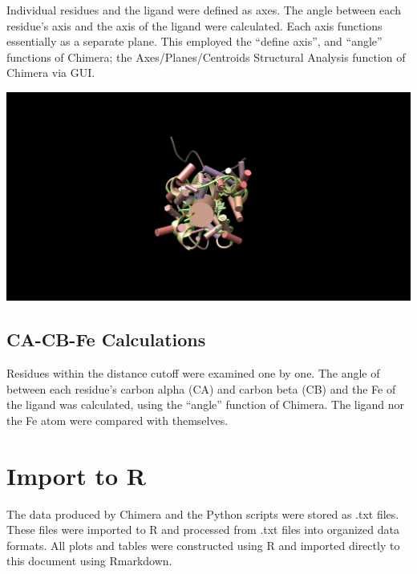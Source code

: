 \documentclass[a4paper, nobind]{templates/ociamthesis}
\let\origfigure\figure
\let\endorigfigure\endfigure
\renewenvironment{figure}[1][2] {
    \expandafter\origfigure\expandafter[H]
} {
    \endorigfigure
}
\begin{document}
Individual residues and the ligand were defined as axes. The angle between each residue's axis and the axis of the ligand were calculated. Each axis functions essentially as a separate plane. This employed the ``define axis'', and ``angle'' functions of Chimera; the Axes/Planes/Centroids Structural Analysis function of Chimera via GUI.

\begin{figure}

{\centering \includegraphics[width=1\linewidth]{figures/1B5M.axes} 

}

\caption{Example of Planar Angles Calculation (1B5M)}\label{fig:axesExample}
\end{figure}

\hypertarget{ca-cb-fe-calculations}{%
\subsection{CA-CB-Fe Calculations}\label{ca-cb-fe-calculations}}

Residues within the distance cutoff were examined one by one. The angle of between each residue's carbon alpha (CA) and carbon beta (CB) and the Fe of the ligand was calculated, using the ``angle'' function of Chimera. The ligand nor the Fe atom were compared with themselves.

\hypertarget{import-to-r}{%
\section{Import to R}\label{import-to-r}}

The data produced by Chimera and the Python scripts were stored as .txt files. These files were imported to R and processed from .txt files into organized data formats. All plots and tables were constructed using R and imported directly to this document using Rmarkdown.
\end{document}
